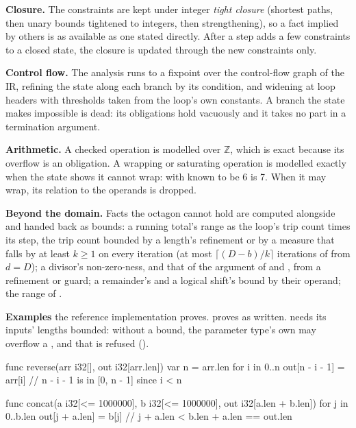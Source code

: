 \pnum
\textbf{Closure.} The constraints are kept under integer \emph{tight closure} (shortest paths,
then unary bounds tightened to integers, then strengthening), so a fact implied by others is as
available as one stated directly. After a step adds a few constraints to a closed state, the
closure is updated through the new constraints only.

\pnum
\textbf{Control flow.} The analysis runs to a fixpoint over the control-flow graph of the IR,
refining the state along each branch by its condition, and widening at loop headers with
thresholds taken from the loop's own constants. A branch the state makes impossible is dead: its
obligations hold vacuously and it takes no part in a termination argument.

\pnum
\textbf{Arithmetic.} A checked operation is modelled over $\mathbb{Z}$, which is exact because
its overflow is an obligation. A wrapping or saturating operation is modelled exactly when the
state shows it cannot wrap:  with  known to be 6 is 7. When it may wrap,
its relation to the operands is dropped.

\pnum
\textbf{Beyond the domain.} Facts the octagon cannot hold are computed alongside and handed
back as bounds: a running total's range as the loop's trip count times its step, the trip
count bounded by a length's refinement or by a measure that falls by at least \(k \ge 1\) on
every iteration (at most \(\lceil (D - b) / k \rceil\) iterations of  from
\(d = D\)); a divisor's
non-zero-ness, and that of the argument of  and , from a 
refinement or guard; a remainder's and a logical shift's bound
by their operand; the range of .

\pnum
\textbf{Examples} the reference implementation proves.  proves as written.
 needs its inputs' lengths bounded: without a bound, the parameter type's own
 may overflow a , and that is refused ().

\begin{example}
\begin{laincode}
func reverse(arr i32[], out i32[arr.len]) {
    var n = arr.len
    for i in 0..n {
        out[n - i - 1] = arr[i]   // n - i - 1 is in [0, n - 1] since i < n
    }
}

func concat(a i32[<= 1000000], b i32[<= 1000000], out i32[a.len + b.len]) {
    for j in 0..b.len {
        out[j + a.len] = b[j]     // j + a.len < b.len + a.len == out.len
    }
}
\end{laincode}
\end{example}
